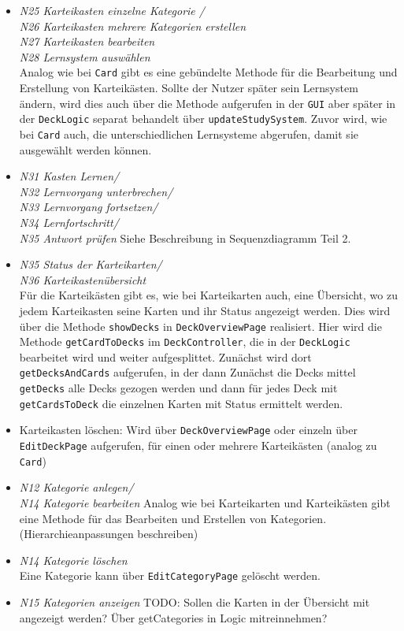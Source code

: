 \documentclass[fontsize=12pt,paper=A4,twoside]{scrartcl}
\begin{document}
    \begin{itemize}
    \item\textit{N25 Karteikasten einzelne Kategorie / \\
    N26 Karteikasten mehrere Kategorien erstellen\\
    N27 Karteikasten bearbeiten\\
    N28 Lernsystem auswählen}\\
    Analog wie bei \texttt{Card} gibt es eine gebündelte Methode für die Bearbeitung und Erstellung von Karteikästen.
    Sollte der Nutzer später sein Lernsystem ändern, wird dies auch über die Methode aufgerufen in der \texttt{GUI} aber später in der \texttt{DeckLogic}
    separat behandelt über \texttt{updateStudySystem}.
    Zuvor wird, wie bei \texttt{Card} auch, die unterschiedlichen Lernsysteme abgerufen, damit sie ausgewählt werden können.
   
    \item \textit{N31 Kasten Lernen/ \\
    N32 Lernvorgang unterbrechen/ \\
    N33 Lernvorgang fortsetzen/ \\
    N34 Lernfortschritt/ \\
    N35 Antwort prüfen}  Siehe Beschreibung in Sequenzdiagramm Teil 2.
    \item \textit{N35 Status der Karteikarten/ \\ N36 Karteikastenübersicht}\\ 
    Für die Karteikästen gibt es, wie bei Karteikarten auch, eine Übersicht, wo zu jedem Karteikasten seine Karten und ihr Status angezeigt werden.
    Dies wird über die Methode \texttt{showDecks} in \texttt{DeckOverviewPage} realisiert. Hier wird die Methode \texttt{getCardToDecks} im \texttt{DeckController}, 
    die in der \texttt{DeckLogic} bearbeitet wird und weiter aufgesplittet. Zunächst wird dort \texttt{getDecksAndCards} aufgerufen, in der dann Zunächst
    die Decks mittel \texttt{getDecks} alle Decks gezogen werden und dann für jedes Deck mit \texttt{getCardsToDeck} die einzelnen Karten mit Status
    ermittelt werden.
    \item Karteikasten löschen: Wird über \texttt{DeckOverviewPage} oder einzeln über \texttt{EditDeckPage} aufgerufen, für einen oder mehrere Karteikästen (analog zu \texttt{Card})
    \end{itemize}
    \begin{itemize}
        \item \textit{N12 Kategorie anlegen/ \\
         N14 Kategorie bearbeiten}
    Analog wie bei Karteikarten und Karteikästen gibt eine Methode für das Bearbeiten und Erstellen von Kategorien. (Hierarchieanpassungen beschreiben)
        \item \textit{N14 Kategorie löschen}\\
    Eine Kategorie kann über \texttt{EditCategoryPage} gelöscht werden.
    \item \textit{N15 Kategorien anzeigen} TODO: Sollen die Karten in der Übersicht mit angezeigt werden? Über getCategories in Logic mitreinnehmen?\\
    \end{itemize}
\end{document}
